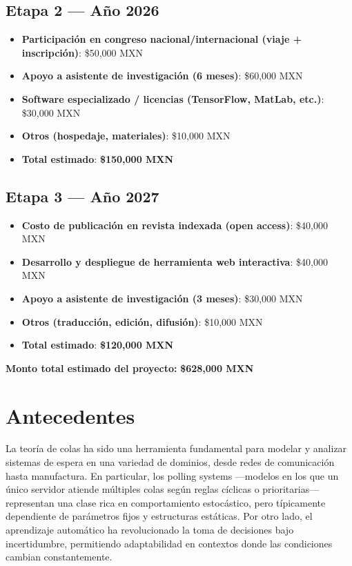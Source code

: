 \documentclass[12pt]{article}
\begin{document}
\subsection*{Etapa 2 — Año 2026}
\begin{itemize}
  \item \textbf{Participación en congreso nacional/internacional (viaje + inscripción)}: \$50,000 MXN
  \item \textbf{Apoyo a asistente de investigación (6 meses)}: \$60,000 MXN
  \item \textbf{Software especializado / licencias (TensorFlow, MatLab, etc.)}: \$30,000 MXN
  \item \textbf{Otros (hospedaje, materiales)}: \$10,000 MXN
  \item \textbf{Total estimado}: \textbf{\$150,000 MXN}
\end{itemize}

\subsection*{Etapa 3 — Año 2027}
\begin{itemize}
  \item \textbf{Costo de publicación en revista indexada (open access)}: \$40,000 MXN
  \item \textbf{Desarrollo y despliegue de herramienta web interactiva}: \$40,000 MXN
  \item \textbf{Apoyo a asistente de investigación (3 meses)}: \$30,000 MXN
  \item \textbf{Otros (traducción, edición, difusión)}: \$10,000 MXN
  \item \textbf{Total estimado}: \textbf{\$120,000 MXN}
\end{itemize}

\textbf{Monto total estimado del proyecto:} \textbf{\$628,000 MXN}


\section{Antecedentes}
La teoría de colas ha sido una herramienta fundamental para modelar y analizar sistemas de espera en una variedad de dominios, desde redes de comunicación hasta manufactura. En particular, los polling systems —modelos en los que un único servidor atiende múltiples colas según reglas cíclicas o prioritarias— representan una clase rica en comportamiento estocástico, pero típicamente dependiente de parámetros fijos y estructuras estáticas. Por otro lado, el aprendizaje automático ha revolucionado la toma de decisiones bajo incertidumbre, permitiendo adaptabilidad en contextos donde las condiciones cambian constantemente.
\end{document}
